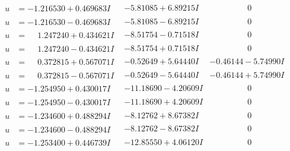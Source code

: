 \documentclass[1p]{elsarticle_modified}
\theoremstyle{definition}
\begin{document}
$$\begin{array}{c|c|c}
\begin{aligned}
u &= -1.216530 + 0.469683 I\end{aligned}
 & -5.81085 + 6.89215 I & \phantom{-0.000000 } 0 \\ \hline\begin{aligned}
u &= -1.216530 - 0.469683 I\end{aligned}
 & -5.81085 - 6.89215 I & \phantom{-0.000000 } 0 \\ \hline\begin{aligned}
u &= \phantom{-}1.247240 + 0.434621 I\end{aligned}
 & -8.51754 - 0.71518 I & \phantom{-0.000000 } 0 \\ \hline\begin{aligned}
u &= \phantom{-}1.247240 - 0.434621 I\end{aligned}
 & -8.51754 + 0.71518 I & \phantom{-0.000000 } 0 \\ \hline\begin{aligned}
u &= \phantom{-}0.372815 + 0.567071 I\end{aligned}
 & -0.52649 + 5.64440 I & -0.46144 - 5.74990 I \\ \hline\begin{aligned}
u &= \phantom{-}0.372815 - 0.567071 I\end{aligned}
 & -0.52649 - 5.64440 I & -0.46144 + 5.74990 I \\ \hline\begin{aligned}
u &= -1.254950 + 0.430017 I\end{aligned}
 & -11.18690 - 4.20609 I & \phantom{-0.000000 } 0 \\ \hline\begin{aligned}
u &= -1.254950 - 0.430017 I\end{aligned}
 & -11.18690 + 4.20609 I & \phantom{-0.000000 } 0 \\ \hline\begin{aligned}
u &= -1.234600 + 0.488294 I\end{aligned}
 & -8.12762 + 8.67382 I & \phantom{-0.000000 } 0 \\ \hline\begin{aligned}
u &= -1.234600 - 0.488294 I\end{aligned}
 & -8.12762 - 8.67382 I & \phantom{-0.000000 } 0 \\ \hline\begin{aligned}
u &= -1.253400 + 0.446739 I\end{aligned}
 & -12.85550 + 4.06120 I & \phantom{-0.000000 } 0 \\ \hline\begin{aligned}

\end{aligned}
\end{array}$$
\end{document}
